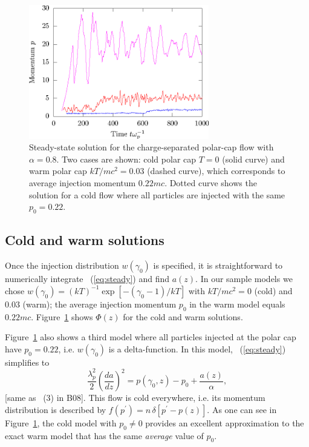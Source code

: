\begin{figure}[h]
\begin{center}
  \includegraphics[width=0.7\textwidth]{pics/chap2/f1.eps}
  \caption[Steady-state solution for $\alpha < 0$]{Steady-state solution for the
    charge-separated polar-cap flow with $\alpha=0.8$. Two cases are shown: cold
    polar cap $T=0$ (solid curve) and warm polar cap $kT/mc^2=0.03$ (dashed
    curve), which corresponds to average injection momentum $0.22mc$. Dotted
    curve shows the solution for a cold flow where all particles are injected
    with the same $p_0=0.22$. }
\label{fig:steady}
\end{center}
\end{figure}


\subsection{Cold and warm solutions}\label{sec:solutions}

Once the injection distribution $w(\gamma_0)$ is specified,
it is straightforward to numerically integrate \Eq~(\ref{eq:steady}) and find $a(z)$.
In our sample models we chose
$w(\gamma_0)=(kT)^{-1}\exp[-(\gamma_0-1)/kT]$ with $kT/mc^2=0$ (cold) and
0.03 (warm); the average injection momentum $p_0$ in the warm model equals
$0.22mc$. Figure~\ref{fig:steady} shows $\Phi(z)$ for the cold and warm solutions.

Figure~\ref{fig:steady} also shows a third model where all particles injected at the polar cap
have $p_0=0.22$, i.e. $w(\gamma_0)$ is a delta-function.
In this model, \Eq~(\ref{eq:steady}) simplifies to
\begin{equation}
\label{eq:cold}
    \frac{\lambda_p^2}{2}\left(\frac{da}{dz}\right)^2 = p(\gamma_0,z)-p_0
                                                                               + \frac{a(z)}{\alpha},
\end{equation}
[same as \Eq~(3) in B08]. This flow is cold everywhere, i.e. its momentum
distribution is described by $f(p^\prime)=n\,\delta[p^\prime-p(z)]$.
As one can see in Figure~\ref{fig:steady}, the cold model with $p_0\neq 0$ provides an
excellent approximation to the exact warm model that has the same {\it average}
value of $p_0$.

